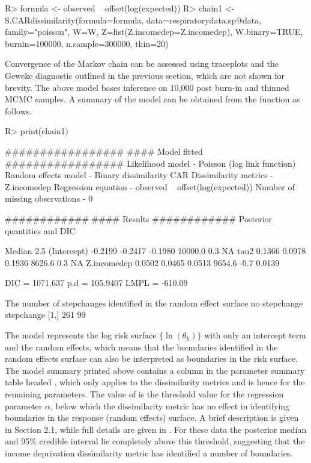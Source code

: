 \documentclass[article,shortnames,nojss]{jss}
\begin{document}
\begin{CodeInput}
R> formula <- observed ~ offset(log(expected))
R> chain1 <- S.CARdissimilarity(formula=formula, data=respiratorydata.sp@data, 
                family="poisson", W=W, Z=list(Z.incomedep=Z.incomedep), 
                W.binary=TRUE, burnin=100000, n.sample=300000, thin=20)
\end{CodeInput}

Convergence of the  Markov chain can be assessed using traceplots and the Geweke diagnostic outlined in the previous section, which are not shown for brevity. The above model bases inference on 10,000 post burn-in and thinned MCMC samples. A summary of the model can be obtained from the  function as follows.

\begin{CodeInput}
R> print(chain1)
\end{CodeInput}


\begin{CodeOutput}
#################
#### Model fitted
#################
Likelihood model - Poisson (log link function) 
Random effects model - Binary dissimilarity CAR 
Dissimilarity metrics -  Z.incomedep 
Regression equation - observed ~ offset(log(expected))
Number of missing observations - 0

############
#### Results
############
Posterior quantities and DIC

             Median    2.5%
(Intercept) -0.2199 -0.2417 -0.1980     10000.0         0.3        NA
tau2         0.1366  0.0978  0.1936      8626.6         0.3        NA
Z.incomedep  0.0502  0.0465  0.0513      9654.6        -0.7    0.0139

DIC =  1071.637       p.d =  105.9407       LMPL =  -610.09 

The number of stepchanges identified in the random effect surface
     no stepchange stepchange
[1,]           261         99
\end{CodeOutput}

The model represents the log risk surface $\{\ln(\theta_k)\}$ with only an intercept term and the random effects, which means that the boundaries identified in the random effects surface can also be interpreted as boundaries in the risk surface. The model summary printed above contains a column in the parameter summary table headed , which only applies to the dissimilarity metrics and is hence  for the remaining parameters. The value of  is the threshold value for the regression parameter $\alpha$, below which the dissimilarity metric has no effect in identifying boundaries in the response (random effects) surface. A brief description is given in Section 2.1, while full details are given in \cite{lee2012}. For these data the posterior median and 95$\%$ credible interval lie completely above this threshold, suggesting that the income deprivation dissimilarity metric has identified a number of boundaries.
\end{document}
